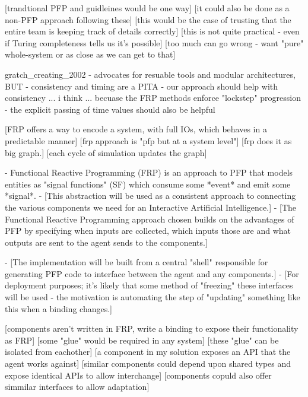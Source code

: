 



[trandtional PFP and guidleines would be one way]
    [it could also be done as a non-PFP approach following these]
    [this would be the case of trusting that the entire team is keeping track of details correctly]
    [this is not quite practical - even if Turing completeness tells us it's possible]
    [too much can go wrong - want "pure" whole-system or as close as we can get to that]


gratch_creating_2002
- advocates for resuable tools and modular architectures, BUT
- consistency and timing are a PITA
	- our approach should help with consistency ... i think ... becuase the FRP methods enforce "lockstep" progression
	- the explicit passing of time values should also be helpful


[FRP offers a way to encode a system, with full IOs, which behaves in a predictable manner]
    [frp approach is "pfp but at a system level"]
    [frp does it as big graph.]
    [each cycle of simulation updates the graph]

- Functional Reactive Programming (FRP) is an approach to PFP that models entities as "signal functions" (SF) which consume some *event* and emit some *signal*.\footnotemark
- [This abstraction will be used as a consistent approach to connecting the various components we need for an Interactive Artificial Intelligence.]
- [The Functional Reactive Programming approach chosen builds on the advantages of PFP by specifying when inputs are collected, which inputs those are and what outputs are sent to the agent sends to the components.]

- [The implementation will be built from a central "shell" responsible for generating PFP code to interface between the agent and any components.]
    - [For deployment purposes; it's likely that some method of "freezing" these interfaces will be used - the motivation is automating the step of "updating" something like this when a binding changes.]



[components aren't written in FRP, write a binding to expose their functionality as FRP]
    [some "glue" would be required in any system]
    [these "glue" can be isolated from eachother]
        [a component in my solution exposes an API that the agent works against]
        [similar components could depend upon shared types and expose identical APIs to allow interchange]
        [components copuld also offer simmilar interfaces to allow adaptation]



